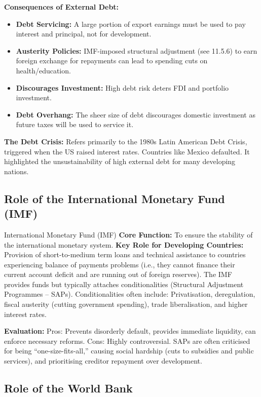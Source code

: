 \documentclass[11pt, a4paper, twoside]{book}
\begin{document}
\textbf{Consequences of External Debt:}
\begin{itemize}
  \item \textbf{Debt Servicing:} A large portion of export earnings must be used to pay interest and principal, not for development.
  \item \textbf{Austerity Policies:} IMF-imposed structural adjustment (see 11.5.6) to earn foreign exchange for repayments can lead to spending cuts on health/education.
  \item \textbf{Discourages Investment:} High debt risk deters FDI and portfolio investment.
  \item \textbf{Debt Overhang:} The sheer size of debt discourages domestic investment as future taxes will be used to service it.
\end{itemize}

\textbf{The Debt Crisis:} Refers primarily to the 1980s Latin American Debt Crisis, triggered when the US raised interest rates. Countries like Mexico defaulted. It highlighted the unsustainability of high external debt for many developing nations.

\subsection{Role of the International Monetary Fund (IMF)}

\begin{keyterm}{International Monetary Fund (IMF)}
\textbf{Core Function:} To ensure the stability of the international monetary system. \textbf{Key Role for Developing Countries:} Provision of short-to-medium term loans and technical assistance to countries experiencing balance of payments problems (i.e., they cannot finance their current account deficit and are running out of foreign reserves). The IMF provides funds but typically attaches conditionalities (Structural Adjustment Programmes -- SAPs). Conditionalities often include: Privatisation, deregulation, fiscal austerity (cutting government spending), trade liberalisation, and higher interest rates.
\end{keyterm}

\textbf{Evaluation:} Pros: Prevents disorderly default, provides immediate liquidity, can enforce necessary reforms. Cons: Highly controversial. SAPs are often criticised for being ``one-size-fits-all,'' causing social hardship (cuts to subsidies and public services), and prioritising creditor repayment over development.

\subsection{Role of the World Bank}
\end{document}
